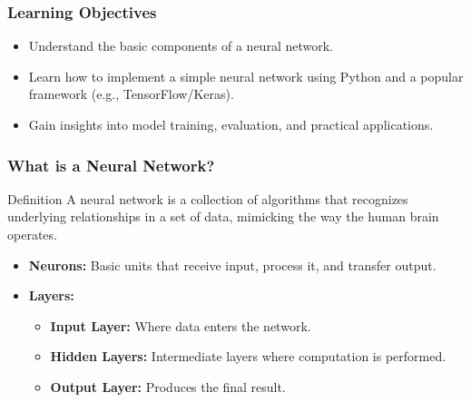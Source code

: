 \documentclass[aspectratio=169]{beamer}
\begin{document}
\begin{frame}
  \frametitle{Learning Objectives}
  \begin{itemize}
    \item Understand the basic components of a neural network.
    \item Learn how to implement a simple neural network using Python and a popular framework (e.g., TensorFlow/Keras).
    \item Gain insights into model training, evaluation, and practical applications.
  \end{itemize}
\end{frame}

\begin{frame}
  \frametitle{What is a Neural Network?}
  \begin{block}{Definition}
    A neural network is a collection of algorithms that recognizes underlying relationships in a set of data, mimicking the way the human brain operates.
  \end{block}
  \begin{itemize}
    \item \textbf{Neurons:} Basic units that receive input, process it, and transfer output.
    \item \textbf{Layers:}
    \begin{itemize}
      \item \textbf{Input Layer:} Where data enters the network.
      \item \textbf{Hidden Layers:} Intermediate layers where computation is performed.
      \item \textbf{Output Layer:} Produces the final result.
    \end{itemize}
  \end{itemize}
\end{frame}
\end{document}
